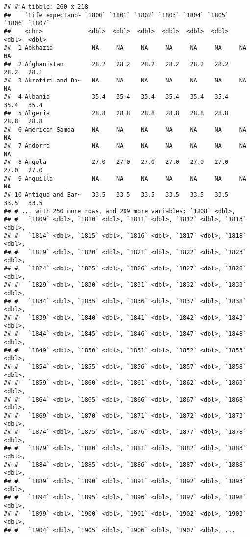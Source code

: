 \documentclass[]{book}
\begin{document}
\begin{verbatim}
## # A tibble: 260 x 218
##    `Life expectanc~ `1800` `1801` `1802` `1803` `1804` `1805` `1806` `1807`
##    <chr>             <dbl>  <dbl>  <dbl>  <dbl>  <dbl>  <dbl>  <dbl>  <dbl>
##  1 Abkhazia           NA     NA     NA     NA     NA     NA     NA     NA  
##  2 Afghanistan        28.2   28.2   28.2   28.2   28.2   28.2   28.2   28.1
##  3 Akrotiri and Dh~   NA     NA     NA     NA     NA     NA     NA     NA  
##  4 Albania            35.4   35.4   35.4   35.4   35.4   35.4   35.4   35.4
##  5 Algeria            28.8   28.8   28.8   28.8   28.8   28.8   28.8   28.8
##  6 American Samoa     NA     NA     NA     NA     NA     NA     NA     NA  
##  7 Andorra            NA     NA     NA     NA     NA     NA     NA     NA  
##  8 Angola             27.0   27.0   27.0   27.0   27.0   27.0   27.0   27.0
##  9 Anguilla           NA     NA     NA     NA     NA     NA     NA     NA  
## 10 Antigua and Bar~   33.5   33.5   33.5   33.5   33.5   33.5   33.5   33.5
## # ... with 250 more rows, and 209 more variables: `1808` <dbl>,
## #   `1809` <dbl>, `1810` <dbl>, `1811` <dbl>, `1812` <dbl>, `1813` <dbl>,
## #   `1814` <dbl>, `1815` <dbl>, `1816` <dbl>, `1817` <dbl>, `1818` <dbl>,
## #   `1819` <dbl>, `1820` <dbl>, `1821` <dbl>, `1822` <dbl>, `1823` <dbl>,
## #   `1824` <dbl>, `1825` <dbl>, `1826` <dbl>, `1827` <dbl>, `1828` <dbl>,
## #   `1829` <dbl>, `1830` <dbl>, `1831` <dbl>, `1832` <dbl>, `1833` <dbl>,
## #   `1834` <dbl>, `1835` <dbl>, `1836` <dbl>, `1837` <dbl>, `1838` <dbl>,
## #   `1839` <dbl>, `1840` <dbl>, `1841` <dbl>, `1842` <dbl>, `1843` <dbl>,
## #   `1844` <dbl>, `1845` <dbl>, `1846` <dbl>, `1847` <dbl>, `1848` <dbl>,
## #   `1849` <dbl>, `1850` <dbl>, `1851` <dbl>, `1852` <dbl>, `1853` <dbl>,
## #   `1854` <dbl>, `1855` <dbl>, `1856` <dbl>, `1857` <dbl>, `1858` <dbl>,
## #   `1859` <dbl>, `1860` <dbl>, `1861` <dbl>, `1862` <dbl>, `1863` <dbl>,
## #   `1864` <dbl>, `1865` <dbl>, `1866` <dbl>, `1867` <dbl>, `1868` <dbl>,
## #   `1869` <dbl>, `1870` <dbl>, `1871` <dbl>, `1872` <dbl>, `1873` <dbl>,
## #   `1874` <dbl>, `1875` <dbl>, `1876` <dbl>, `1877` <dbl>, `1878` <dbl>,
## #   `1879` <dbl>, `1880` <dbl>, `1881` <dbl>, `1882` <dbl>, `1883` <dbl>,
## #   `1884` <dbl>, `1885` <dbl>, `1886` <dbl>, `1887` <dbl>, `1888` <dbl>,
## #   `1889` <dbl>, `1890` <dbl>, `1891` <dbl>, `1892` <dbl>, `1893` <dbl>,
## #   `1894` <dbl>, `1895` <dbl>, `1896` <dbl>, `1897` <dbl>, `1898` <dbl>,
## #   `1899` <dbl>, `1900` <dbl>, `1901` <dbl>, `1902` <dbl>, `1903` <dbl>,
## #   `1904` <dbl>, `1905` <dbl>, `1906` <dbl>, `1907` <dbl>, ...
\end{verbatim}
\end{document}
